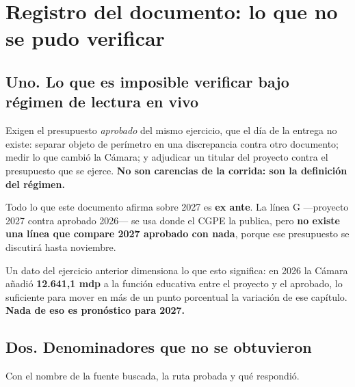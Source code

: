 \chapter*{Registro del documento: lo que no se pudo verificar}

\section*{Uno. Lo que es imposible verificar bajo régimen de lectura en vivo}

Exigen el presupuesto \emph{aprobado} del mismo ejercicio, que el día de la entrega no existe:
separar objeto de perímetro en una discrepancia contra otro documento; medir lo que cambió la
Cámara; y adjudicar un titular del proyecto contra el presupuesto que se ejerce. \textbf{No
son carencias de la corrida: son la definición del régimen.}

Todo lo que este documento afirma sobre 2027 es \textbf{ex ante}. La línea G ---proyecto 2027
contra aprobado 2026--- se usa donde el CGPE la publica, pero \textbf{no existe una línea que
compare 2027 aprobado con nada}, porque ese presupuesto se discutirá hasta noviembre.

Un dato del ejercicio anterior dimensiona lo que esto significa: en 2026 la Cámara añadió
\textbf{12.641,1 mdp} a la función educativa entre el proyecto y el aprobado, lo suficiente
para mover en más de un punto porcentual la variación de ese capítulo. \textbf{Nada de eso es
pronóstico para 2027.}

\section*{Dos. Denominadores que no se obtuvieron}

Con el nombre de la fuente buscada, la ruta probada y qué respondió.

